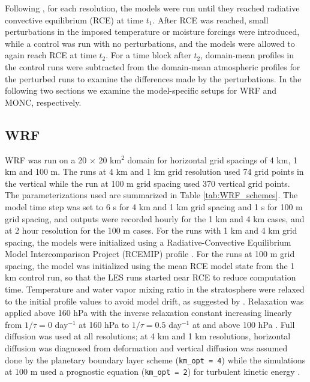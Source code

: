 \documentclass[draft]{agujournal2019}
\begin{document}
Following \cite{Kuang_JAS_2010}, for each resolution, the models were run until
they reached radiative convective equilibrium (RCE) at time $t_1$. After RCE was
reached, small perturbations in the imposed temperature or moisture forcings
were introduced, while a control was run with no perturbations, and the models
were allowed to again reach RCE at time $t_2$. For a time block after $t_2$,
domain-mean profiles in the control runs were subtracted from the  domain-mean
atmospheric profiles for the perturbed runs to examine the differences made by
the perturbations. In the following two sections we examine the model-specific
setups for WRF and MONC, respectively.

\subsection{WRF}

WRF was run on a 20 $\times$ 20 km$^2$ domain for horizontal grid spacings of 4
km, 1 km and 100 m. The runs at 4 km and 1 km grid resolution used 74 grid
points in the vertical while the run at 100 m grid spacing used 370 vertical
grid points. The parameterizations used are summarized in Table
\ref{tab:WRF_schemes}. The model time step was set to 6 s for 4 km and 1 km grid
spacing and 1 s for 100 m grid spacing, and outputs were recorded hourly for the
1 km and 4 km cases, and at 2 hour resolution for the 100 m cases. For the runs
with 1 km and 4 km grid spacing, the models were initialized using a
Radiative-Convective Equilibrium Model Intercomparison Project (RCEMIP) profile
\cite{Wing_GMD_2018}. For the runs at 100 m grid spacing, the model was
initialized using the mean RCE model state from the 1 km control run, so that
the LES runs started near RCE to reduce computation time. Temperature and water
vapor mixing ratio in the stratosphere were relaxed to the initial profile
values to avoid model drift, as suggested by .
Relaxation was applied above 160 hPa with the inverse relaxation constant
increasing linearly from $1/\tau = 0$ day$^{-1}$ at 160 hPa to $1/\tau = 0.5$
day$^{-1}$ at and above 100 hPa \cite{Herman_JAMES_2013}. Full diffusion was
used at all resolutions; at 4 km and 1 km resolutions, horizontal diffusion was
diagnosed from deformation and vertical diffusion was assumed done by the
planetary boundary layer scheme (\texttt{km\_opt = 4}) while the simulations at
100 m used a prognostic equation (\texttt{km\_opt = 2}) for turbulent kinetic
energy \cite{Skamarock_2019}.
\end{document}
